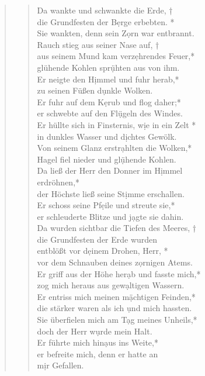 



\begin{quote}
\begin{verse}


\smallskip
Da wankte und schwankte die Erde, †\\ \vin
die Grundfesten der B\d erge erbebten. *\\ \vin
Sie wankten, denn sein Z\d orn war entbrannt.\\

Rauch stieg aus seiner Nase auf, †\\
aus seinem Mund kam verz\d ehrendes Feuer,*\\ 
glühende Kohlen spr\d ühten aus von ihm.\\ \vin
Er neigte den H\d immel und fuhr herab,*\\ \vin
zu seinen Füßen d\d unkle Wolken.\\
Er fuhr auf dem K\d erub und flog daher;*\\
er schwebte auf den Fl\d ügeln des Windes.\\ \vin
Er hüllte sich in Finsternis, w\d ie in ein Zelt *\\ \vin
in dunkles Wasser und d\d ichtes Gewölk.\\
Von seinem Glanz erstr\d ahlten die Wolken,*\\
Hagel fiel nieder und gl\d ühende Kohlen.\\ \vin
Da ließ der Herr den Donner im H\d immel\\ \vin  erdröhnen,*\\ \vin
der Höchste ließ seine St\d imme erschallen.\\ 
Er schoss seine Pf\d eile und streute sie,*\\ 
er schleuderte Blitze und j\d agte sie dahin.\\ \vin
Da wurden sichtbar die Tiefen des Meeres, †\\ \vin
die Grundfesten der Erde wurden \\ \vin entblößt vor d\d einem Drohen, Herr, *\\ \vin
vor dem Schnauben deines z\d ornigen Atems.\\

Er griff aus der Höhe her\d ab und fasste mich,*\\
zog mich heraus aus gew\d altigen Wassern.\\ \vin
Er entriss mich meinen m\d ächtigen Feinden,*\\ \vin
die stärker waren als ich \d und mich hassten.\\
Sie überfielen mich am T\d ag meines Unheils,*\\
doch der Herr w\d urde mein Halt.\\ \vin
Er führte mich hin\d aus ins Weite,*\\ \vin
er befreite mich, denn er hatte an\\ \vin  m\d ir Gefallen.\\


\end{verse}
\end{quote}
